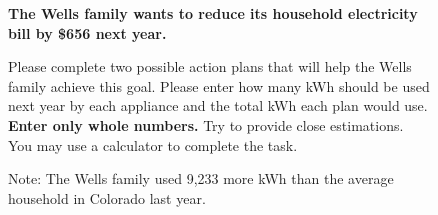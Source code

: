 \documentclass{article}
\begin{document}
\begin{figure}[h]
\centering
{}
\bigskip

\textbf{The Wells family wants to reduce its household electricity bill by \$656 next year.}

Please complete two possible action plans that will help the Wells family achieve this goal. Please enter how many kWh should be used next year by each appliance and the total kWh each plan would use. \textbf{Enter only whole numbers.} Try to provide close estimations. You may use a calculator to complete the task.

Note: The Wells family used 9,233 more kWh than the average household in Colorado last year.
\end{figure}
\end{document}
